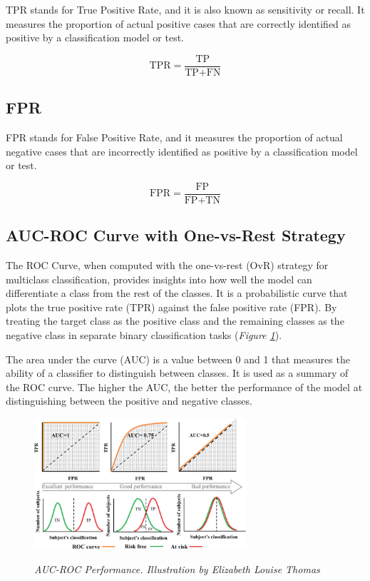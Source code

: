 TPR stands for True Positive Rate, and it is also known as sensitivity or
recall. It measures the proportion of actual positive cases that are correctly
identified as positive by a classification model or test.

\[
  \text{TPR} = \frac{\text{TP}}{\text{TP} + \text{FN}}
\]

\subsection{FPR}

FPR stands for False Positive Rate, and it measures the proportion of actual
negative cases that are incorrectly identified as positive by a classification
model or test.

\[ \text{FPR} = \frac{\text{FP}}{\text{FP} + \text{TN}} \]

\subsection{AUC-ROC Curve with One-vs-Rest Strategy}

The ROC Curve, when computed with the one-vs-rest (OvR) strategy for multiclass
classification, provides insights into how well the model can differentiate a
class from the rest of the classes. It is a probabilistic curve that plots the
true positive rate (TPR) against the false positive rate (FPR). By treating the
target class as the positive class and the remaining classes as the negative
class in separate binary classification tasks (\textit{Figure
\ref{fig:auc-roc}}).

The area under the curve (AUC) is a value between 0 and 1 that measures the
ability of a classifier to distinguish between classes. It is used as a summary
of the ROC curve. The higher the AUC, the better the performance of the model
at distinguishing between the positive and negative classes.

\begin{figure}[H]
  \centering
  \includegraphics[width=0.7\textwidth]{imatges/preliminaries/auc.png}
  \caption[AUC-ROC Performance]{\textit{AUC-ROC Performance. Illustration by Elizabeth Louise Thomas}}
  {\label{fig:auc-roc}}
\end{figure}


